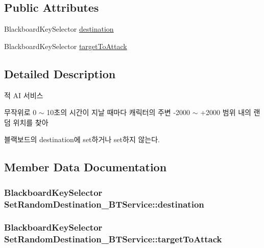 \subsection*{Public Attributes}
\begin{DoxyCompactItemize}
\item 
Blackboard\+Key\+Selector \hyperlink{class_set_random_destination___b_t_service_ab259c7024b387a7320ea85e5df8d7016}{destination}
\item 
Blackboard\+Key\+Selector \hyperlink{class_set_random_destination___b_t_service_a6c67414130286ac84e546e73af226b2c}{target\+To\+Attack}
\end{DoxyCompactItemize}


\subsection{Detailed Description}
적 AI 서비스 

무작위로 0 $\sim$ 10초의 시간이 지날 때마다 캐릭터의 주변 -\/2000 $\sim$ +2000 범위 내의 랜덤 위치를 찾아

블랙보드의 destination에 set하거나 set하지 않는다. 

\subsection{Member Data Documentation}
\subsubsection[{\texorpdfstring{destination}{destination}}]{\setlength{\rightskip}{0pt plus 5cm}Blackboard\+Key\+Selector Set\+Random\+Destination\+\_\+\+B\+T\+Service\+::destination}\hypertarget{class_set_random_destination___b_t_service_ab259c7024b387a7320ea85e5df8d7016}{}\label{class_set_random_destination___b_t_service_ab259c7024b387a7320ea85e5df8d7016}
\subsubsection[{\texorpdfstring{target\+To\+Attack}{targetToAttack}}]{\setlength{\rightskip}{0pt plus 5cm}Blackboard\+Key\+Selector Set\+Random\+Destination\+\_\+\+B\+T\+Service\+::target\+To\+Attack}\hypertarget{class_set_random_destination___b_t_service_a6c67414130286ac84e546e73af226b2c}{}\label{class_set_random_destination___b_t_service_a6c67414130286ac84e546e73af226b2c}
